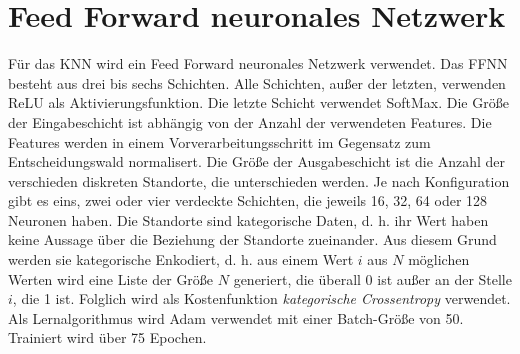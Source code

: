 \section{Feed Forward neuronales Netzwerk}
Für das KNN wird ein Feed Forward neuronales Netzwerk verwendet.
Das FFNN besteht aus drei bis sechs Schichten.
Alle Schichten, außer der letzten, verwenden ReLU als Aktivierungsfunktion.
Die letzte Schicht verwendet SoftMax.
\newline
\newline
Die Größe der Eingabeschicht ist abhängig von der Anzahl der verwendeten Features.
Die Features werden in einem Vorverarbeitungsschritt im Gegensatz zum Entscheidungswald normalisert.
Die Größe der Ausgabeschicht ist die Anzahl der verschieden diskreten Standorte, die unterschieden werden.
Je nach Konfiguration gibt es eins, zwei oder vier verdeckte Schichten, die jeweils 16, 32, 64 oder 128 Neuronen haben.
\newline
\newline
Die Standorte sind kategorische Daten, d. h. ihr Wert haben keine Aussage über die Beziehung der Standorte zueinander.
Aus diesem Grund werden sie kategorische Enkodiert, d. h. aus einem Wert $i$ aus $N$ möglichen Werten wird eine Liste der Größe $N$ generiert,
die überall 0 ist außer an der Stelle $i$, die 1 ist.
Folglich wird als Kostenfunktion \textit{kategorische Crossentropy} verwendet.
\newline
\newline
Als Lernalgorithmus wird Adam verwendet mit einer Batch-Größe von 50.
Trainiert wird über 75 Epochen.

\iffalse
\begin{itemize}
    \item Braucht man mehr Neuronen/Hidden Layer mit steigender Ort Anzahl?
\end{itemize}
\fi